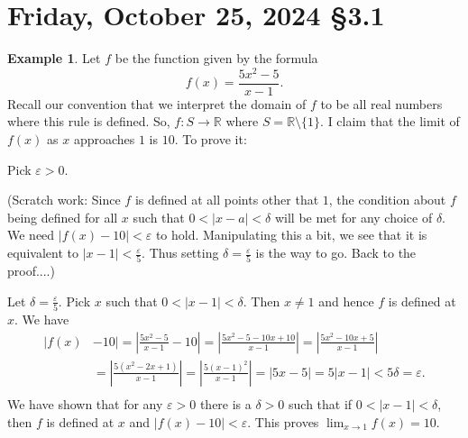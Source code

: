 \documentclass[12pt]{amsart}
\def\Fr{Friday}
\def\d{\delta}
\def\e{\varepsilon}
\newcommand{\R}{{\mathbb{R}}}
\numberwithin{equation}{section}
\theoremstyle{plain} %
\newcommand{\Oct}[3]{\section{#2, October #1, 2024 \quad \S#3}}
\theoremstyle{definition}
\newtheorem{ex}[equation]{Example}
\theoremstyle{remark}
\begin{document}
\newpage

\Oct{25}{\Fr}{3.1}


\begin{ex} Let $f$ be the function given by the formula
$$
 f(x) = \frac{5x^2-5}{x-1}.
$$
Recall our convention that we interpret the domain of $f$ to be all real numbers where this rule is defined. So, $f: S \to \R$ where $S = \R \setminus \{1\}$. I claim that the limit of $f(x)$  as $x$ approaches $1$ is $10$. To prove it:

Pick $\e > 0$.

(Scratch work: Since $f$ is defined at all points other that $1$, the condition about $f$ being defined for all $x$ such that $0 < |x-a| < \d$ will be  met for any choice of $\delta$. 
We need $|f(x) - 10| < \e$ to
hold. Manipulating this a bit, we see that it is equivalent to $|x-1|  < \frac{\e}{5}$. Thus setting $\d = \frac{\e}{5}$ is the way to go. Back to the proof....)

Let $\d = \frac{\e}{5}$. Pick $x$ such that $0 < |x-1| < \d$. Then $x \ne 1$ and hence $f$ is defined at $x$. We have
$$
\begin{aligned}
|f(x) &- 10|  =  \left|\frac{5x^2-5}{x-1} - 10\right|=  \left|\frac{5x^2-5-10x+10}{x-1}\right|  =  \left|\frac{5x^2-10x + 5}{x-1}\right| \\ 
& =  \left|\frac{5(x^2-2x +1)}{x-1}\right| =  \left|\frac{5(x-1)^2 }{x-1}\right|  =  |5x-5|  =  5|x-1| < 5 \d  = \e. \\
\end{aligned}
$$
We have shown that for any $\e>0$ there is a $\d>0$ such that 
if $0 < |x-1|< \d$, then $f$ is defined at $x$ and $|f(x) - 10| < \e$. This proves $\lim_{x \to 1} f(x) = 10$.  
\end{ex}


\end{document}
